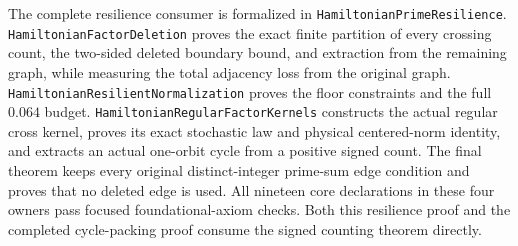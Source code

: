 The complete resilience consumer is formalized in
\texttt{HamiltonianPrimeResilience}.
\texttt{HamiltonianFactorDeletion} proves the exact finite
partition of every crossing count, the two-sided deleted
boundary bound, and extraction from the remaining graph,
while measuring the total adjacency loss from the original
graph. \texttt{HamiltonianResilientNormalization} proves
the floor constraints and the full \(0.064\) budget.
\texttt{HamiltonianRegularFactorKernels} constructs the
actual regular cross kernel, proves its exact stochastic
law and physical centered-norm identity, and extracts an
actual one-orbit cycle from a positive signed count.
The final theorem keeps every original distinct-integer
prime-sum edge condition and proves that no deleted edge is
used. All nineteen core declarations in these four owners
pass focused foundational-axiom checks. Both this resilience
proof and the completed cycle-packing proof consume the
signed counting theorem directly.
